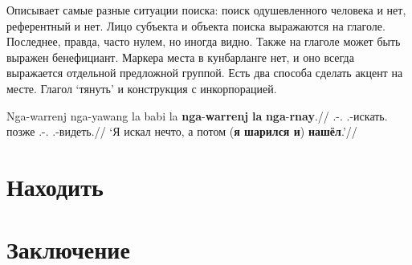 Описывает самые разные ситуации поиска: поиск одушевленного человека и нет, референтный и нет. Лицо субъекта и объекта поиска выражаются на глаголе. Последнее, правда, часто нулем, но иногда видно. Также на глаголе может быть выражен бенефициант. Маркера места в кунбарланге нет, и оно всегда выражается отдельной предложной группой. 
Есть два способа сделать акцент на месте. Глагол `тянуть' и конструкция с инкорпорацией.

\begingl
\gla Nga-warrenj nga-yawang la babi la \textbf{nga}-\textbf{warrenj} \textbf{la} \textbf{nga}-\textbf{rnay}.//
\glb \Fsg.\Real-\warre.\Pst{} \Fsg.\Real-искать.\Pst{} \la{} позже \la{} \Fsg.\Real-\warre.\Pst{} \la{} \Fsg.\Real-видеть.\Pst{}//
\glft `Я искал нечто, а потом (\textbf{я шарился и}) \textbf{нашёл}.'\trailingcitation{[IK1-170610\_1SY-02/54:02--10]}//
\endgl\xe

\section{Находить}

\section{Заключение}

